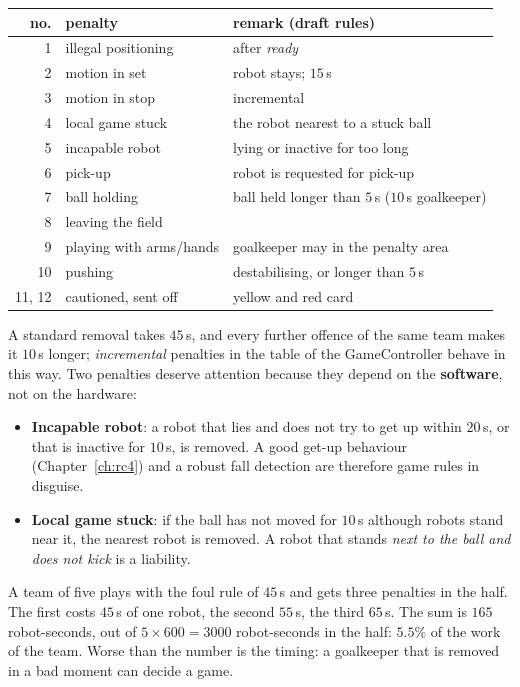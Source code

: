 \begin{center}
\small
\begin{tabular}{rll}
\hline
no. & penalty & remark (draft rules)\\
\hline
1 & illegal positioning & after \emph{ready}\\
2 & motion in set & robot stays; $15$\,s\\
3 & motion in stop & incremental\\
4 & local game stuck & the robot nearest to a stuck ball\\
5 & incapable robot & lying or inactive for too long\\
6 & pick-up & robot is requested for pick-up\\
7 & ball holding & ball held longer than $5$\,s ($10$\,s goalkeeper)\\
8 & leaving the field & \\
9 & playing with arms/hands & goalkeeper may in the penalty area\\
10 & pushing & destabilising, or longer than $5$\,s\\
11, 12 & cautioned, sent off & yellow and red card\\
\hline
\end{tabular}
\end{center}
A standard removal takes $45$\,s, and every further offence of the same team makes it $10$\,s longer; \emph{incremental} penalties in the table of the GameController behave in this way. Two penalties deserve attention because they depend on the \textbf{software}, not on the hardware:
\begin{itemize}[nosep]
 \item \textbf{Incapable robot}: a robot that lies and does not try to get up within $20$\,s, or that is inactive for $10$\,s, is removed. A good get-up behaviour (Chapter~\ref{ch:rc4}) and a robust fall detection are therefore game rules in disguise.
 \item \textbf{Local game stuck}: if the ball has not moved for $10$\,s although robots stand near it, the nearest robot is removed. A robot that stands \emph{next to the ball and does not kick} is a liability.
\end{itemize}

\begin{example}
A team of five plays with the foul rule of $45$\,s and gets three penalties in the half. The first costs $45$\,s of one robot, the second $55$\,s, the third $65$\,s. The sum is $165$ robot-seconds, out of $5\times600=3000$ robot-seconds in the half: $5.5\%$ of the work of the team. Worse than the number is the timing: a goalkeeper that is removed in a bad moment can decide a game.
\end{example}

